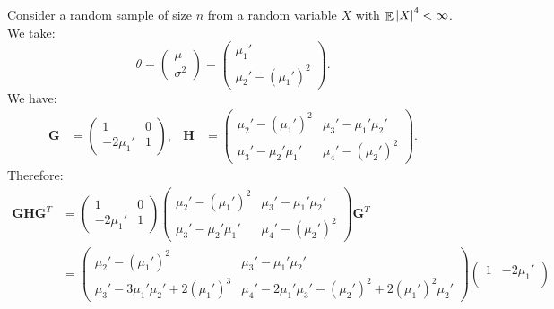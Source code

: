\documentclass{huhtakm-template-book-v2}
\DeclareMathOperator{\E}{\mathbb{E}}
\begin{document}
    \begin{eg}
        Consider a random sample of size $n$ from a random variable $X$ with $\E\abs{X}^{4} < \infty$. We take:
        \begin{equation*}
            \theta = \begin{pmatrix}
                \mu\\ \sigma^{2}
            \end{pmatrix} = \begin{pmatrix}
                \mu_{1}'\\ \mu_{2}' - (\mu_{1}')^{2}
            \end{pmatrix}.
        \end{equation*}
        We have:
        \begin{align*}
            \mathbf{G} &= \begin{pmatrix}
                1 & 0\\
                -2\mu_{1}' & 1
            \end{pmatrix}, & \mathbf{H} &= \begin{pmatrix}
                \mu_{2}' - (\mu_{1}')^{2} & \mu_{3}' - \mu_{1}'\mu_{2}'\\
                \mu_{3}' - \mu_{2}'\mu_{1}' & \mu_{4}' - (\mu_{2}')^{2}
            \end{pmatrix}.
        \end{align*}
        Therefore:
        \begin{align*}
            \mathbf{GHG}^{T} &= \begin{pmatrix}
                1 & 0\\
                -2\mu_{1}' & 1
            \end{pmatrix} \begin{pmatrix}
                \mu_{2}' - (\mu_{1}')^{2} & \mu_{3}' - \mu_{1}'\mu_{2}'\\
                \mu_{3}' - \mu_{2}'\mu_{1}' & \mu_{4}' - (\mu_{2}')^{2}
            \end{pmatrix} \mathbf{G}^{T}\\
            &=\begin{pmatrix}
                \mu_{2}' - (\mu_{1}')^{2} & \mu_{3}' - \mu_{1}'\mu_{2}'\\
                \mu_{3}' - 3\mu_{1}'\mu_{2}' + 2(\mu_{1}')^{3} & \mu_{4}' - 2\mu_{1}'\mu_{3}' - (\mu_{2}')^{2} + 2(\mu_{1}')^{2}\mu_{2}'
            \end{pmatrix}\begin{pmatrix}
                1 & -2\mu_{1}'\\

\end{pmatrix}
\end{align*}
\end{eg}
\end{document}
